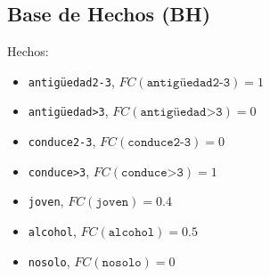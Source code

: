 \subsection{Base de Hechos (BH)}
Hechos:
\begin{itemize}
    \item \texttt{antigüedad2-3}, $FC(\texttt{antigüedad2-3}) = 1$
    \item \texttt{antigüedad>3}, $FC(\texttt{antigüedad>3}) = 0$
    \item \texttt{conduce2-3}, $FC(\texttt{conduce2-3}) = 0$
    \item \texttt{conduce>3}, $FC(\texttt{conduce>3}) = 1$
    \item \texttt{joven}, $FC(\texttt{joven}) = 0.4$
    \item \texttt{alcohol}, $FC(\texttt{alcohol}) = 0.5$
    \item \texttt{nosolo}, $FC(\texttt{nosolo}) = 0$
\end{itemize}
